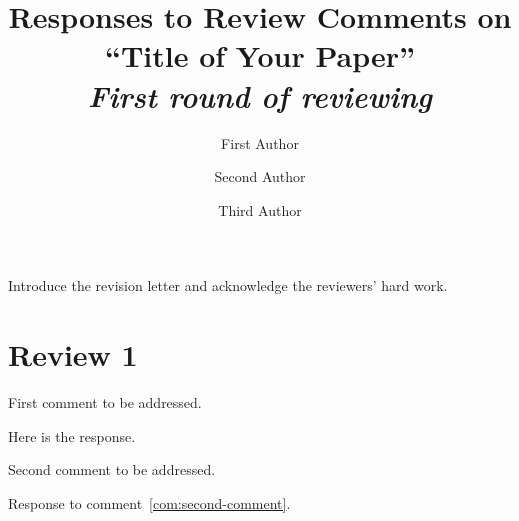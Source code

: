 \documentclass[a4]{article}
\begin{document}
\title{Responses to Review Comments on ``Title of Your Paper'' \\
  \vspace{0.5em} \large \emph{First round of reviewing}}
\author{First Author \and Second Author \and Third Author}

\maketitle

\setlength\parindent{0pt}

\noindent Introduce the revision letter and acknowledge the reviewers'
hard work.

\section{Review 1}
\label{sec:review1}

\begin{revcom}
  First comment to be addressed.
\end{revcom}

\begin{response}
  Here is the response.
\end{response}

\begin{revcom}
  Second comment to be addressed.
\end{revcom}

\begin{response}
  Response to comment~\ref{com:second-comment}.
\end{response}



\end{document}
